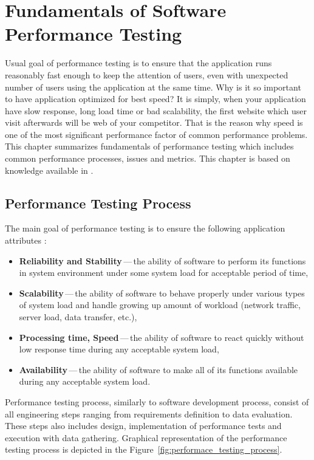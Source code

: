 
\chapter{Fundamentals of Software Performance Testing}
\label{Fundamentals of Software Performance Testing}
Usual goal of performance testing is to ensure that the application runs reasonably fast enough to keep the attention of users, even with unexpected number of users using the application at the same time. Why is it so important to have application optimized for best speed? It is simply, when your application have slow response, long load time or bad scalability, the first website which user visit afterwards will be web of your competitor. That is the reason why speed is one of the most significant performance factor of common performance problems. This chapter summarizes fundamentals of performance testing which includes common performance processes, issues and metrics. This chapter is based on knowledge available in \cite{Molyneaux:TAoAPT, Kurkova:Thesis:2017, DIN:PHD}.


\section{Performance Testing Process}
\label{Performance Testing Process}
The main goal of performance testing is to ensure the following application attributes \cite{GAO:MEASURING}:

\begin{itemize}
	\setlength\itemsep{0em}
	\item \textbf{Reliability and Stability}\,---\,the ability of software to perform its functions in system environment under some system load for acceptable period of time,
	\item \textbf{Scalability}\,---\,the ability of software to behave properly under various types of system load and handle growing up amount of workload (network traffic, server load, data transfer, etc.),
	\item \textbf{Processing time, Speed}\,---\,the ability of software to react quickly without low response time during any acceptable system load,
	\item \textbf{Availability}\,---\,the ability of software to make all of its functions available during any acceptable system load.
\end{itemize}

Performance testing process, similarly to software development process, consist of all engineering steps ranging from requirements definition to data evaluation. These steps also includes design, implementation of performance tests and execution with data gathering. Graphical representation of the performance testing process is depicted in the Figure~\ref{fig:performace_testing_process}. 

